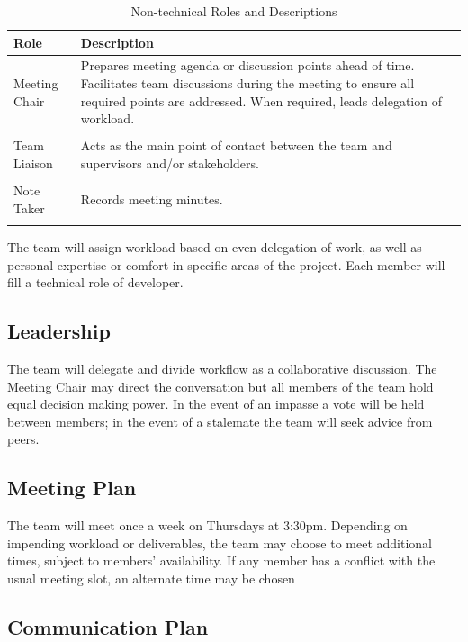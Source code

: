 \documentclass{article}
\begin{document}
\begin{table}[ht]
\centering
\caption{Non-technical Roles and Descriptions}
\label{tab:non-technical-roles}
\begin{tabularx}{\textwidth}{lX}
\toprule
\textbf{Role} & \textbf{Description} \\
\midrule

Meeting Chair & Prepares meeting agenda or discussion points ahead of time. Facilitates team discussions during the meeting to ensure all required points are addressed. When required, leads delegation of workload.  \\ \\
Team Liaison & Acts as the main point of contact between the team and supervisors and/or stakeholders.  \\ \\
Note Taker & Records meeting minutes. \\ \\
\bottomrule
\end{tabularx}
\end{table}

The team will assign workload based on even delegation of work, as well as personal expertise or comfort in specific areas of the project. Each member will fill a technical role of developer. \\

\subsection{Leadership}

The team will delegate and divide workflow as a collaborative discussion. The Meeting Chair may direct the conversation but all members of the team hold equal decision making power. In the event of an impasse a vote will be held between members; in the event of a stalemate the team will seek advice from peers. \\

\subsection{Meeting Plan}

The team will meet once a week on Thursdays at 3:30pm. Depending on impending workload or deliverables, the team may choose to meet additional times, subject to members' availability. If any member has a conflict with the usual meeting slot, an alternate time may be chosen

\subsection{Communication Plan}
\end{document}
